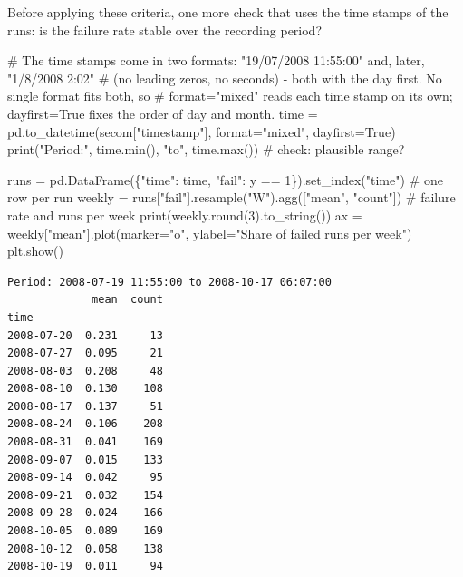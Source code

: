 \documentclass[
  letterpaper,
  DIV=11,
  numbers=noendperiod]{scrreprt}
\newenvironment{Shaded}{\begin{snugshade}}{\end{snugshade}}
\newcommand{\BuiltInTok}[1]{\textcolor[rgb]{0.00,0.23,0.31}{#1}}
\newcommand{\CommentTok}[1]{\textcolor[rgb]{0.37,0.37,0.37}{#1}}
\newcommand{\DecValTok}[1]{\textcolor[rgb]{0.68,0.00,0.00}{#1}}
\newcommand{\NormalTok}[1]{\textcolor[rgb]{0.00,0.23,0.31}{#1}}
\newcommand{\OperatorTok}[1]{\textcolor[rgb]{0.37,0.37,0.37}{#1}}
\newcommand{\StringTok}[1]{\textcolor[rgb]{0.13,0.47,0.30}{#1}}
\newcommand{\VariableTok}[1]{\textcolor[rgb]{0.07,0.07,0.07}{#1}}
\begin{document}
Before applying these criteria, one more check that uses the time stamps
of the runs: is the failure rate stable over the recording period?

\begin{Shaded}
\begin{Highlighting}[]
\CommentTok{\# The time stamps come in two formats: "19/07/2008 11:55:00" and, later, "1/8/2008 2:02"}
\CommentTok{\# (no leading zeros, no seconds) {-} both with the day first. No single format fits both, so}
\CommentTok{\# format="mixed" reads each time stamp on its own; dayfirst=True fixes the order of day and month.}
\NormalTok{time }\OperatorTok{=}\NormalTok{ pd.to\_datetime(secom[}\StringTok{"timestamp"}\NormalTok{], }\BuiltInTok{format}\OperatorTok{=}\StringTok{"mixed"}\NormalTok{, dayfirst}\OperatorTok{=}\VariableTok{True}\NormalTok{)}
\BuiltInTok{print}\NormalTok{(}\StringTok{"Period:"}\NormalTok{, time.}\BuiltInTok{min}\NormalTok{(), }\StringTok{"to"}\NormalTok{, time.}\BuiltInTok{max}\NormalTok{())       }\CommentTok{\# check: plausible range?}

\NormalTok{runs }\OperatorTok{=}\NormalTok{ pd.DataFrame(\{}\StringTok{"time"}\NormalTok{: time, }\StringTok{"fail"}\NormalTok{: y }\OperatorTok{==} \DecValTok{1}\NormalTok{\}).set\_index(}\StringTok{"time"}\NormalTok{)   }\CommentTok{\# one row per run}
\NormalTok{weekly }\OperatorTok{=}\NormalTok{ runs[}\StringTok{"fail"}\NormalTok{].resample(}\StringTok{"W"}\NormalTok{).agg([}\StringTok{"mean"}\NormalTok{, }\StringTok{"count"}\NormalTok{])   }\CommentTok{\# failure rate and runs per week}
\BuiltInTok{print}\NormalTok{(weekly.}\BuiltInTok{round}\NormalTok{(}\DecValTok{3}\NormalTok{).to\_string())}
\NormalTok{ax }\OperatorTok{=}\NormalTok{ weekly[}\StringTok{"mean"}\NormalTok{].plot(marker}\OperatorTok{=}\StringTok{"o"}\NormalTok{, ylabel}\OperatorTok{=}\StringTok{"Share of failed runs per week"}\NormalTok{)}
\NormalTok{plt.show()}
\end{Highlighting}
\end{Shaded}

\begin{verbatim}
Period: 2008-07-19 11:55:00 to 2008-10-17 06:07:00
             mean  count
time                    
2008-07-20  0.231     13
2008-07-27  0.095     21
2008-08-03  0.208     48
2008-08-10  0.130    108
2008-08-17  0.137     51
2008-08-24  0.106    208
2008-08-31  0.041    169
2008-09-07  0.015    133
2008-09-14  0.042     95
2008-09-21  0.032    154
2008-09-28  0.024    166
2008-10-05  0.089    169
2008-10-12  0.058    138
2008-10-19  0.011     94
\end{verbatim}
\end{document}
